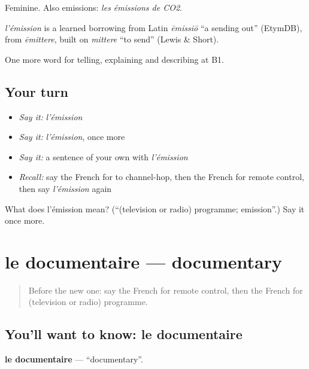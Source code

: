 Feminine. Also emissions: \emph{les émissions de CO2}.

\begin{cousinweb}
\emph{l'émission} is a learned borrowing from Latin \emph{ēmissiō} \textquotedblleft{}a sending out\textquotedblright{} (EtymDB), from \emph{ēmittere}, built on \emph{mittere} \textquotedblleft{}to send\textquotedblright{} (Lewis \& Short).
\end{cousinweb}

\begin{grammarlens}[title={What you've built}]
One more word for telling, explaining and describing at B1.
\end{grammarlens}

\subsection*{Your turn}
\begin{itemize}
\raggedright
  \item \emph{Say it:} \emph{l'émission}
  \item \emph{Say it:} \emph{l'émission}, once more
  \item \emph{Say it:} a sentence of your own with \emph{l'émission}
  \item \emph{Recall:} say the French for to channel-hop, then the French for remote control, then say \emph{l'émission} again
\end{itemize}

\begin{tcolorbox}[breakable,colback=teal!4,colframe=teal!35!black,title={Before you move on}]
What does l'émission mean? (\textquotedblleft{}(television or radio) programme; emission\textquotedblright{}.) Say it once more.
\end{tcolorbox}
\section[le documentaire]{le documentaire — documentary}

\label{lesson:FR-C525-documentaire}



\begin{quote}
Before the new one: say the French for remote control, then the French for (television or radio) programme.
\end{quote}

\subsection*{You'll want to know: le documentaire}
\textbf{le documentaire} — \textquotedblleft{}documentary\textquotedblright{}.

